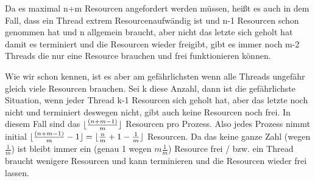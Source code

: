 Da es maximal n+m Resourcen angefordert werden müssen, heißt es auch in dem Fall, dass ein Thread extrem Resourcenaufwändig ist und n-1 Resourcen schon genommen hat und n allgemein braucht, aber nicht das letzte sich geholt hat damit es terminiert und die Resourcen wieder freigibt, gibt es immer noch m-2 Threads die nur eine Resource brauchen und frei funktionieren können.


Wie wir schon kennen, ist es aber am gefährlichsten wenn alle Threads ungefähr gleich viele Resourcen brauchen. Sei k diese Anzahl, dann ist die gefährlichste Situation, wenn jeder Thread k-1 Resourcen sich geholt hat, aber das letzte noch nicht und terminiert deswegen nicht, gibt auch keine Resourcen noch frei. In diesem Fall sind das $\lfloor{\frac{(n+m -1)}{m}}\rfloor$ Resourcen pro Prozess. Also jedes Prozess nimmt initial $\lfloor{\frac{(n+m -1)}{m} - 1 }\rfloor = \lfloor{\frac{n}{m} + 1 - \frac{1}{m} }\rfloor$ Resourcen. Da das keine ganze Zahl (wegen $\frac{1}{m}$) ist bleibt immer ein (genau 1 wegen $m\frac{1}{m}$) Resource frei / bzw. ein Thread braucht wenigere Resourcen und kann terminieren und die Resourcen wieder frei lassen. 

